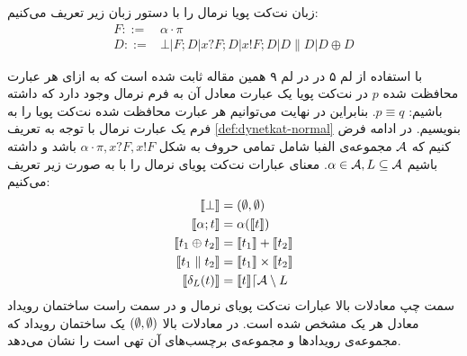 \begin{definition}
    \label{def:dynetkat-normal}
    زبان نت‌کت پویا‌ نرمال را با دستور زبان زیر تعریف می‌کنیم:
    \begin{align*}
        F ::= & \alpha\cdot\pi                                          \\
        D ::= & \bot | F;D | x?F;D | x!F;D | D \parallel D | D \oplus D
    \end{align*}
\end{definition}
با استفاده از لم ۵ در 
\cite{dynetkat}
در لم ۹ همین مقاله
ثابت شده است که
به ازای هر عبارت محافظت شده
$p$
در نت‌کت پویا یک عبارت معادل آن به فرم نرمال وجود دارد که داشته باشیم:
$p \equiv q$.
بنابراین در نهایت می‌توانیم هر عبارت محافظت شده نت‌کت پویا را به فرم یک عبارت نرمال
با توجه به تعریف
\ref{def:dynetkat-normal}
بنویسیم.
در ادامه فرض کنیم که
$\mathcal{A}$
مجموعه‌ی الفبا شامل تمامی حروف به شکل
$\alpha\cdot\pi,x?F,x!F$
باشد و داشته باشیم
$\alpha \in \mathcal{A}, L \subseteq \mathcal{A}$.
معنای عبارات نت‌کت پویای نرمال را با به صورت زیر تعریف می‌کنیم:
\begin{align*}
    \llbracket \bot \rrbracket              & = (\emptyset,\emptyset)                               \\
    \llbracket \alpha;t \rrbracket          & = \alpha(\llbracket t \rrbracket)                       \\
    \llbracket t_1 \oplus t_2 \rrbracket    & = \llbracket t_1 \rrbracket + \llbracket t_2 \rrbracket                 \\
    \llbracket t_1 \parallel t_2 \rrbracket & = \llbracket t_1 \rrbracket \times \llbracket t_2 \rrbracket            \\
    \llbracket \delta_{L}(t) \rrbracket     & = \llbracket t \rrbracket\lceil \mathcal{A} \setminus L
\end{align*}
سمت چپ معادلات بالا عبارات نت‌کت پویای نرمال و در سمت راست ساختمان رویداد معادل هر یک مشخص شده است.
در معادلات بالا
$(\emptyset,\emptyset)$
یک ساختمان رویداد که مجموعه‌ی رویداد‌ها و مجموعه‌ی برچسب‌های آن تهی است را نشان می‌دهد.